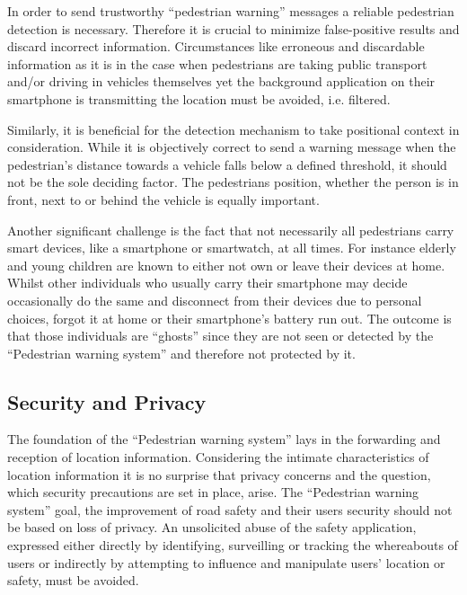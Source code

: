 In order to send trustworthy ``pedestrian warning'' messages a reliable pedestrian detection is necessary. Therefore it is crucial to minimize false-positive results and discard incorrect information.
Circumstances like erroneous and discardable information as it is in the case when pedestrians are taking public transport and/or driving in vehicles themselves yet the background application on their smartphone is transmitting the location must be avoided, i.e. filtered.

Similarly, it is beneficial for the detection mechanism to take positional context in consideration. While it is objectively correct to send a warning message when the pedestrian's distance towards a vehicle falls below a defined threshold, it should not be the sole deciding factor. The pedestrians position, whether the person is in front, next to or behind the vehicle is equally important.

Another significant challenge is the fact that not necessarily all pedestrians carry smart devices, like a smartphone or smartwatch, at all times. 
For instance elderly and young children are known to either not own or leave their devices at home. Whilst other individuals who usually carry their smartphone may decide occasionally do the same and disconnect from their devices due to personal choices, forgot it at home or their smartphone's battery run out. The outcome is that those individuals are ``ghosts'' since they are not seen or detected by the ``Pedestrian warning system'' and therefore not protected by it.

\subsection{Security and Privacy}
The foundation of the ``Pedestrian warning system'' lays in the forwarding and reception of location information. Considering the intimate characteristics of location information it is no surprise that privacy concerns and the question, which security precautions are set in place, arise. The ``Pedestrian warning system'' goal, the improvement of road safety and their users security should not be based on loss of privacy. An unsolicited abuse of the safety application, expressed either directly by identifying, surveilling or tracking the whereabouts of users or indirectly by attempting to influence and manipulate users' location or safety, must be avoided.

